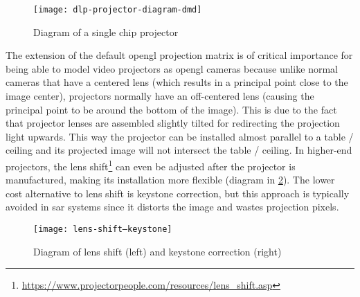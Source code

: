 \begin{figure}[H]
	\centering
	\texttt{[image: dlp-projector-diagram-dmd]}
	\caption[Diagram of a single chip  projector]{Diagram of a single chip  projector\protect\footnotemark}
	\label{fig:dlp-projector-diagram-dmd}
	\vspace{-0.7em}
\end{figure}

The extension of the default \gls{opengl} projection matrix is of critical importance for being able to model video projectors as \gls{opengl} cameras because unlike normal cameras that have a centered lens (which results in a principal point close to the image center), projectors normally have an off-centered lens (causing the principal point to be around the bottom of the image). This is due to the fact that projector lenses are assembled slightly tilted for redirecting the projection light upwards. This way the projector can be installed almost parallel to a table / ceiling and its projected image will not intersect the table / ceiling. In higher-end projectors, the lens shift\footnote{\url{https://www.projectorpeople.com/resources/lens_shift.asp}} can even be adjusted after the projector is manufactured, making its installation more flexible (diagram in \cref{fig:lens-shift--keystone}). The lower cost alternative to lens shift is keystone correction, but this approach is typically avoided in \gls{sar} systems since it distorts the image and wastes projection pixels.

\begin{figure}[H]
	\centering
	\texttt{[image: lens-shift--keystone]}
	\caption[Diagram of lens shift (left) and keystone correction (right)]{Diagram of lens shift (left) and keystone correction (right)\protect\footnotemark}
	\label{fig:lens-shift--keystone}
	\vspace{-0.7em}
\end{figure}

